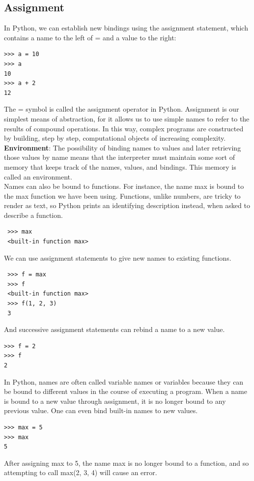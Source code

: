 \documentclass[11pt]{article}
\begin{document}
\subsection{Assignment}
In Python, we can establish new bindings using the assignment statement, which contains a name to the left of = and a value to the right: 
\begin{lstlisting}
>>> a = 10 
>>> a 
10 
>>> a + 2
12 
\end{lstlisting}
The = symbol is called the assignment operator in Python. Assignment is our simplest means of abstraction, for it allows us to use simple names to refer to the results of compound operations. In this way, complex programs are constructed by building, step by step, computational objects of increasing complexity. \\ 
\textbf{Environment}: 
The possibility of binding names to values and later retrieving those values by name means that the interpreter must maintain some sort of memory that keeps track of the names, values, and bindings. This memory is called an environment. \\
\newline
Names can also be bound to functions. For instance, the name max is bound to the max function we have been using. Functions, unlike numbers, are tricky to render as text, so Python prints an identifying description instead, when asked to describe a function. 
\begin{lstlisting}
 >>> max 
 <built-in function max>
\end{lstlisting}
We can use assignment statements to give new names to existing functions.
\begin{lstlisting}
 >>> f = max
 >>> f 
 <built-in function max>
 >>> f(1, 2, 3) 
 3
\end{lstlisting}
And successive assignment statements can rebind a name to a new value. 
\begin{lstlisting}
>>> f = 2
>>> f
2 
\end{lstlisting} 
In Python, names are often called variable names or variables because they can be bound to different values in the course of executing a program. When a name is bound to a new value through assignment, it is no longer bound to any previous value. One can even bind built-in names to new values. 
\begin{lstlisting} 
>>> max = 5
>>> max 
5
\end{lstlisting} 
After assigning max to 5, the name max is no longer bound to a function, and so attempting to call max(2, 3, 4) will cause an error. 
\end{document}
